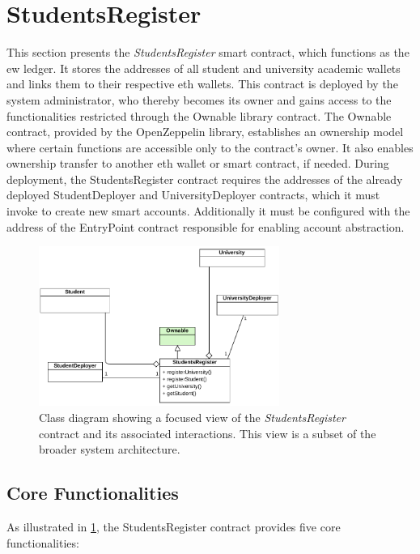 \section{StudentsRegister}
This section presents the \textit{StudentsRegister} smart contract, which functions as the \acrlong{ew} ledger. It stores the addresses of all student and university academic wallets and links them to their respective \acrlong{eth} wallets. This contract is deployed by the system administrator, who thereby becomes its owner and gains access to the functionalities restricted through the Ownable library contract. The Ownable contract, provided by the OpenZeppelin library, establishes an ownership model where certain functions are accessible only to the contract's owner. It also enables ownership transfer to another \acrshort{eth} wallet or smart contract, if needed.
During deployment, the StudentsRegister contract requires the addresses of the already deployed StudentDeployer and UniversityDeployer contracts, which it must invoke to create new smart accounts. Additionally it must be configured with the address of the EntryPoint contract responsible for enabling account abstraction.
\begin{figure}
  \centering
  \includegraphics[width=0.7\textwidth]{figures/StudentsRegister class diagram.pdf}
  \caption[Class diagram focused on \textit{StudentsRegister} contract]{Class diagram showing a focused view of the \textit{StudentsRegister} contract and its associated interactions. This view is a subset of the broader system architecture.}
  \label{fig:studentsRegisterContractClass}
\end{figure}

\subsection{Core Functionalities}
As illustrated in \cref{fig:studentsRegisterContractClass}, the StudentsRegister contract provides five core functionalities:

